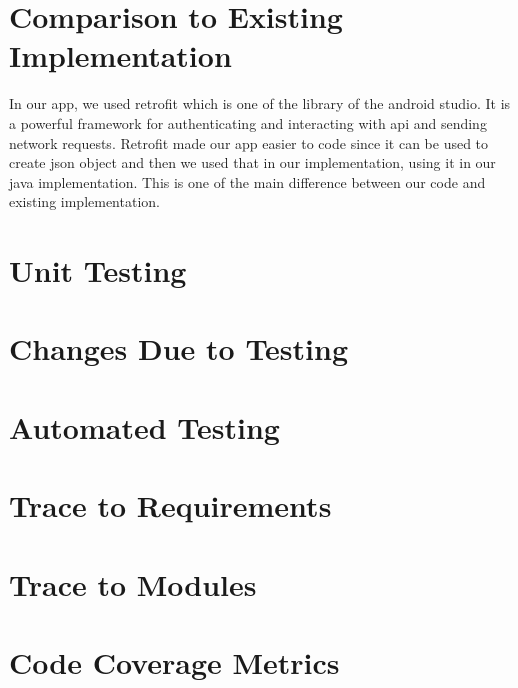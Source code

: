 \documentclass[12pt, titlepage]{article}
\begin{document}
	
\section{Comparison to Existing Implementation}	

In our app, we used retrofit which is one of the library of the android studio. It is a powerful framework for authenticating and interacting with api and sending network requests. Retrofit made our app easier to code since it can be used to create json object and then we used that in our implementation, using it in our java implementation. This is one of the main difference between our code and existing implementation. 

\section{Unit Testing}

\section{Changes Due to Testing}

\section{Automated Testing}
		
\section{Trace to Requirements}
		
\section{Trace to Modules}		

\section{Code Coverage Metrics}




\end{document}

